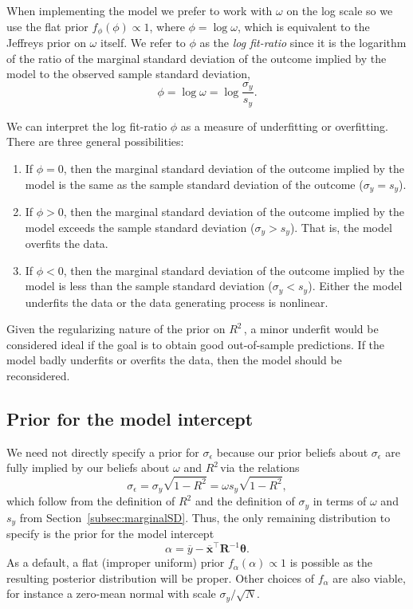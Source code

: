 \documentclass[11pt]{article}
\newcommand{\Rsq}{$R^2\,$}
\newcommand{\boldtheta}{\boldsymbol{\theta}}
\newcommand{\sigmaEps}{\sigma_{\epsilon}}
\newcommand{\R}{\mathbf{R}}
\begin{document}
When implementing the model we prefer to work with $\omega$ on the log scale
so we use the flat prior $f_\phi(\phi) \propto 1$, where $\phi =
\log{\omega}$, which is equivalent to the Jeffreys prior on $\omega$ itself. We
refer to $\phi$ as the \emph{log fit-ratio} since it is the logarithm of the
ratio of the marginal standard deviation of the outcome implied by the model to
the observed sample standard deviation,
%
$$\phi = \log{\omega} = \log{\frac{\sigma_y}{s_y}}.$$

We can interpret the log fit-ratio $\phi$ as a measure of underfitting or
overfitting. There are three general possibilities:

\begin{enumerate}
\item If $\phi = 0$, then the marginal standard deviation of
the outcome implied by the model is the same as the sample standard deviation of
the outcome  ($\sigma_y = s_y$).
\item If $\phi > 0$, then the marginal standard deviation of the outcome implied
by the model exceeds the sample standard deviation ($\sigma_y > s_y$). That is,
the model overfits the data.
\item If $\phi < 0$, then the marginal standard deviation of the outcome implied
by the model is less than the sample standard deviation  ($\sigma_y < s_y$).
Either the model underfits the data or the data generating process is nonlinear.
\end{enumerate}
%
Given the regularizing nature of the prior on \Rsq, a minor underfit would be
considered ideal if the goal is to obtain good out-of-sample predictions. If the
model badly underfits or overfits the data, then the model should be
reconsidered.

\subsection{Prior for the model intercept}
We need not directly specify a prior for $\sigmaEps$ because our prior beliefs
about $\sigmaEps$ are fully implied by our beliefs about $\omega$ and
\Rsq via the relations
%
$$ \sigmaEps = \sigma_y \sqrt{1 - R^2} = \omega s_y \sqrt{1 - R^2},$$
%
which follow from the definition of $R^2$ and the definition of $\sigma_y$ in
terms of $\omega$ and $s_y$ from Section~\ref{subsec:marginalSD}. Thus, the only
remaining distribution to specify is the prior for the model intercept
$$\alpha = \overline{y} - \overline{\mathbf{x}}^\top \R^{-1} \boldtheta.$$
As a default, a flat (improper uniform) prior $f_\alpha(\alpha) \propto 1$ is
possible as the resulting posterior distribution will be proper. Other choices
of $f_\alpha$ are also viable, for instance a zero-mean normal with scale
$\sigma_y / \sqrt{N}$.
\end{document}
